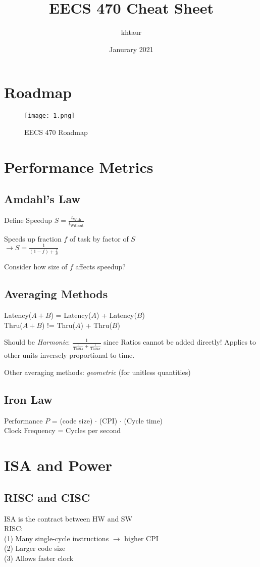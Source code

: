 \documentclass{article}
\title{EECS 470 Cheat Sheet}
\author{khtaur }
\date{Janurary 2021}
\begin{document}
\begin{multicols*}{2}

\section{Roadmap}
\begin{figure}[H]
  \centering
    {\texttt{[image: 1.png]}}
  \caption{EECS 470 Roadmap}
\end{figure}

\section{Performance Metrics}
\subsection*{Amdahl's Law}
Define Speedup $S = \frac{t_{\text{With}}}{t_{\text{Without}}}$ 
\medskip\par\noindent
Speeds up fraction $f$ of task by factor of $S$ \\
$\rightarrow S = \frac{1}{(1-f)+\frac{f}{S}}$
\medskip\par\noindent
Consider how size of $f$ affects speedup?

\subsection*{Averaging Methods}
Latency($A+B$) = Latency($A$) + Latency($B$)\\
Thru($A+B$) != Thru($A$) + Thru($B$)
\medskip\par\noindent
Should be \textit{Harmonic}: $\frac{1}{\frac{1}{\text{Thru}_A} + \frac{1}{\text{Thru}_B}}$ since Ratios cannot be added directly! Applies to other units inversely proportional to time.
\medskip\par\noindent
Other averaging methods: \textit{geometric} (for unitless quantities)

\subsection*{Iron Law}
Performance $P$ = (code size) $\cdot$ (CPI) $\cdot$ (Cycle time) \\
Clock Frequency = Cycles per second

\section{ISA and Power}
\subsection*{RISC and CISC}
ISA is the contract between HW and SW \\
RISC: \\
(1) Many single-cycle instructions $\rightarrow$ higher CPI \\
(2) Larger code size \\
(3) Allows faster clock


\end{multicols*}
\end{document}
